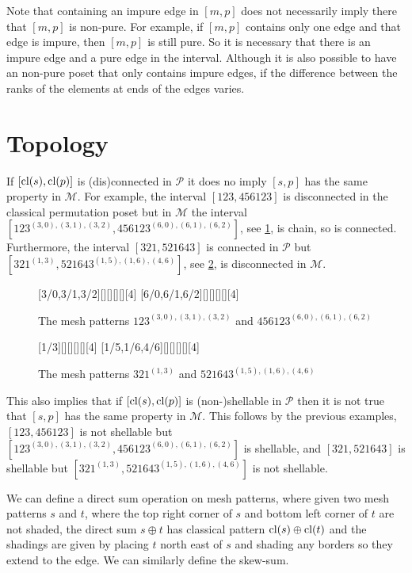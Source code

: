 \documentclass[11pt,a4paper,oneside]{article}
\begin{document}
Note that containing an impure edge in $[m,p]$ does not necessarily imply there that $[m,p]$ is non-pure. For example, if $[m,p]$ contains only one edge and that edge is impure, then $[m,p]$ is still pure. So it is necessary that there is an impure edge and a pure edge in the interval. Although it is also possible to have an non-pure poset that only contains impure edges, if the difference between the ranks of the elements at ends of the edges varies.


\section{Topology}

If $[\operatorname{\textrm{cl}}(s),\operatorname{\textrm{cl}}(p)]$ is (dis)connected in $\mathcal{P}$ it does no imply $[s,p]$ has the same property in $\mathcal{M}$. For example, the interval $[123,456123]$ is disconnected in the classical permutation poset but in $\mathcal{M}$ the interval $[123^{(3,0),(3,1),(3,2)},456123^{(6,0),(6,1),(6,2)}]$, see \cref{fig:123}, is chain, so is connected. Furthermore, the interval $[321,521643]$ is connected in $\mathcal{P}$ but $[321^{(1, 3)},521643^{(1, 5), (1, 6), (4, 6)}]$, see \cref{fig:321}, is disconnected in $\mathcal{M}$.
\begin{figure}[h]\centering
{}[3/0,3/1,3/2][][][][][4]
[6/0,6/1,6/2][][][][][4]
\caption{The mesh patterns $123^{(3,0),(3,1),(3,2)}$ and $456123^{(6,0),(6,1),(6,2)}$}\label{fig:123}
\end{figure}
\begin{figure}[h]\centering
{}[1/3][][][][][4]
[1/5,1/6,4/6][][][][][4]
\caption{The mesh patterns $321^{(1, 3)}$ and $521643^{(1, 5), (1, 6), (4, 6)}$}\label{fig:321}
\end{figure}

This also implies that if $[\operatorname{\textrm{cl}}(s),\operatorname{\textrm{cl}}(p)]$ is (non-)shellable in $\mathcal{P}$ then it is not true that $[s,p]$ has the same property in $\mathcal{M}$. This follows by the previous examples, $[123,456123]$ is not shellable but $[123^{(3,0),(3,1),(3,2)},456123^{(6,0),(6,1),(6,2)}]$ is shellable, and $[321,521643]$ is shellable but $[321^{(1, 3)},521643^{(1, 5), (1, 6), (4, 6)}]$ is not shellable.

We can define a direct sum operation on mesh patterns, where given two mesh patterns $s$ and $t$, where the top right corner of $s$ and bottom left corner of $t$ are not shaded, the direct sum $s\oplus t$ has classical pattern $\operatorname{\textrm{cl}}(s)\oplus\operatorname{\textrm{cl}}(t)$ and the shadings are given by placing $t$ north east of $s$ and shading any borders so they extend to the edge. We can similarly define the skew-sum.
\end{document}

